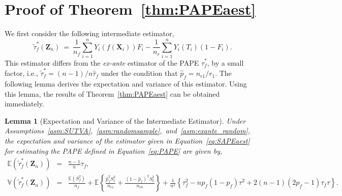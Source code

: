 \documentclass[USenglish,onecolumn]{article}
\renewcommand\r{\right}
\renewcommand\l{\left}
\newcommand\E{\mathbb{E}}
\newcommand\V{\mathbb{V}}
\newcommand\bX{\bm{X}}
\newcommand\bZ{\bm{Z}}
\newtheorem{lemma}{Lemma}
\begin{document}




\appendix
\section{Proof of Theorem~\ref{thm:PAPEaest}}
\label{app:PAPEaest}

We first consider the following intermediate estimator,
\begin{equation}
  \tilde\tau_f^{*}(\bZ_n) \ = \ \frac{1}{n_f}\sum_{i=1}^{n} Y_i(f(\bX_i))F_i-\frac{1}{n_r} \sum_{i=1}^n Y_i(T_i)(1-F_i). \label{eq:SAPEaest}
\end{equation}
This estimator differs from the \textit{ex-ante} estimator of the PAPE
$\hat\tau_f^*$, by a small factor, i.e.,
$\tilde\tau_f^{*} = (n-1)/n \hat\tau_f$ under the condition that $\hat{p}_f=n_{r1}/r_1$. The following lemma
derives the expectation and variance of this estimator.  Using this lemma,
the results of Theorem~\ref{thm:PAPEaest} can be obtained
immediately.
\begin{lemma}[Expectation and Variance of the Intermediate
  Estimator] \label{lemma:SAPEa} Under
  Assumptions~\ref{asm:SUTVA},~\ref{asm:randomsample},~and~\ref{asm:exante_random},
  the expectation and variance of the estimator given in
  Equation~\eqref{eq:SAPEaest} for estimating the PAPE defined in
  Equation~\eqref{eq:PAPE} are given by,
	\begin{eqnarray*}
		\E(\tilde\tau_f^{*}(\bZ_n))& = & \frac{n-1}{n}\tau_f, \\
		\V(\tilde\tau_f^{*}(\bZ_n)) & = &  \frac{\E(S_f^2)}{n_f}+\E\l\{\frac{\hat{p}_f^2S_1^2}{n_{r1}}+\frac{(1-\hat{p}_f)^2S_0^2}{n_{r0}}\r\}+\frac{1}{n^2} \l\{\tau_f^2 -n p_f(1-p_f)
		\tau^2 + 2(n-1)(2p_f-1) \tau_f\tau \r\}.
	\end{eqnarray*}
\end{lemma}
\end{document}

